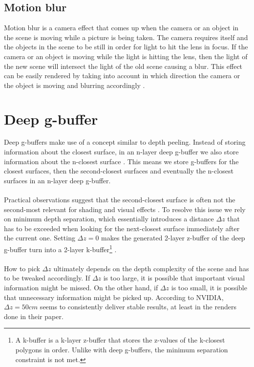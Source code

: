 \documentclass{ACGSeminar}
\begin{document}
	\subsection{Motion blur}
		Motion blur is a camera effect that comes up when the camera or an object in the scene is moving while a picture is being taken. The camera requires itself and the objects in the scene to be still in order for light to hit the lens in focus. If the camera or an object is moving while the light is hitting the lens, then the light of the new scene will intersect the light of the old scene causing a blur. This effect can be easily rendered by taking into account in which direction the camera or the object is moving and blurring accordingly \cite{MOB}.

\section{Deep g-buffer}
	Deep g-buffers make use of a concept similar to depth peeling. Instead of storing information about the closest surface, in an n-layer deep g-buffer we also store information about the n-closest surface \cite{Mara2016DeepGBuffer}. This means we store g-buffers for the closest surfaces, then the second-closest surfaces and eventually the n-closest surfaces in an n-layer deep g-buffer. \\\\
	Practical observations suggest that the second-closest surface is often not the second-most relevant for shading and visual effects \cite{Mara2016DeepGBuffer}. To resolve this issue we rely on minimum depth separation, which essentially introduces a distance $\Delta z$ that has to be exceeded when looking for the next-closest surface immediately after the current one. Setting $\Delta z = 0$ makes the generated 2-layer z-buffer of the deep g-buffer turn into a 2-layer k-buffer\footnote{A k-buffer is a k-layer z-buffer that stores the z-values of the k-closest polygons in order. Unlike with deep g-buffers, the minimum separation constraint is not met.} \cite{MFEKB}. \\\\
	How to pick $\Delta z$ ultimately depends on the depth complexity of the scene and has to be tweaked accordingly. If $\Delta z$ is too large, it is possible that important visual information might be missed. On the other hand, if $\Delta z$ is too small, it is possible that unnecessary information might be picked up. According to NVIDIA, $\Delta z = 50cm$ seems to consistently deliver stable results, at least in the renders done in their paper.
\end{document}
